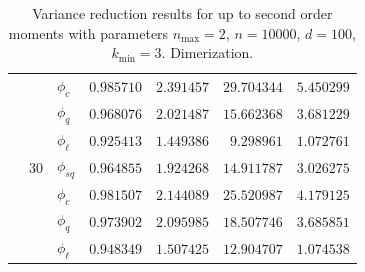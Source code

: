 \begin{table}[htb]
\begin{tabular}{l@{\hskip 12pt}l@{\hskip 12pt}l@{\hskip
    12pt}r@{\hskip 12pt}r@{\hskip 12pt}r@{\hskip 12pt}r}
    &    &$\phi_{c}$ &  $0.985710$ &  $2.391457$ &   $29.704344$ &
    $5.450299$ \\
    &    &$\phi_{q}$ &  $0.968076$ &  $2.021487$ &   $15.662368$ &
    $3.681229$ \\
    &    & $\phi_{\ell}$ &  $0.925413$ &  $1.449386$ &    $9.298961$
    &   $1.072761$ \\\cmidrule{2-7}
    & $30$ &$\phi_{sq}$ &  $0.964855$ &  $1.924268$ &   $14.911787$ &
    $3.026275$ \\
    &    &$\phi_{c}$ &  $0.981507$ &  $2.144089$ &   $25.520987$ &
    $4.179125$ \\
    &    &$\phi_{q}$ &  $0.973902$ &  $2.095985$ &   $18.507746$ &
    $3.685851$ \\
    &    & $\phi_{\ell}$ &  $0.948349$ &  $1.507425$ &   $12.904707$
    &   $1.074538$ \\
    \bottomrule
  \end{tabular}
  \caption[Variance reduction results for up to second order
  moments]{Variance reduction results for up to second order moments
    with parameters $n_{\max}=2$, $n=\num{10000}$, $d=100$,
  $k_{\min}=3$. Dimerization.}
  \label{tab:eff3}
\end{table}


